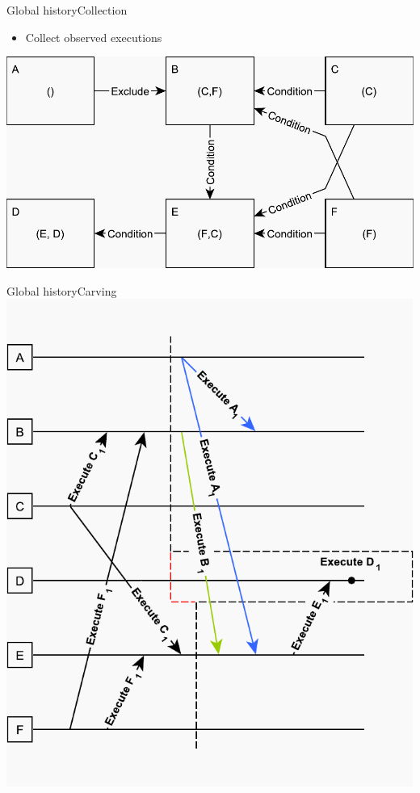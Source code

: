 \documentclass{beamer}
\begin{document}
\begin{frame}{Global history}{Collection}%
    \begin{itemize}
    	\item Collect observed executions
    \end{itemize}
    \vspace{\fill}
    \centering
    \includegraphics[scale=0.5]{figures/inconsistent-cut.pdf}
\end{frame}

\begin{frame}{Global history}{Carving}
	\centering
    \includegraphics[scale=0.6]{figures/consistent-cut.pdf}
\end{frame}
\end{document}
